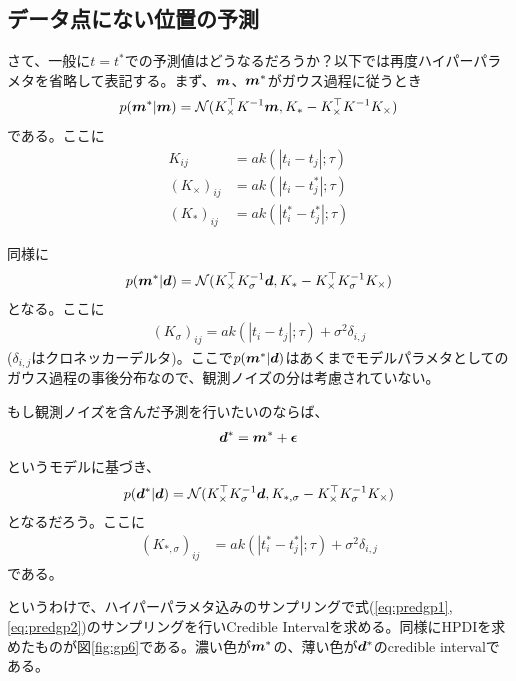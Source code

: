 \subsection*{データ点にない位置の予測}

さて、一般に$t=t^\ast$での予測値はどうなるだろうか？以下では再度ハイパーパラメタを省略して表記する。まず、$\boldsymbol{m}$、$\boldsymbol{m}^\ast$がガウス過程に従うとき
\begin{align}
p(\boldsymbol{m}^\ast|\boldsymbol{m}) = \mathcal{N} (K_{\times}^\top K^{-1}  \boldsymbol{m}, K_\ast - K_\times^\top K^{-1} K_\times)
\end{align}
である。ここに
\begin{align}
K_{ij} &= a k(|t_i-t_j|;\tau) \\
(K_{\times})_{ij} &= a k(|t_i-t^\ast_j|;\tau) \\
(K_{\ast})_{ij} &= a k(|t^\ast_i-t^\ast_j|;\tau) 
\end{align}

同様に
\begin{align}
\label{eq:predgp1}
p(\boldsymbol{m}^\ast|\boldsymbol{d}) =  \mathcal{N} (K_{\times}^\top K_\sigma^{-1}  \boldsymbol{d}, K_{\ast} - K_\times^\top K_\sigma^{-1} K_\times)
\end{align}
となる。ここに
\begin{align}
(K_{\sigma})_{ij} = a k(|t_i-t_j|;\tau) + \sigma^2 \delta_{i,j}
\end{align}
($\delta_{i,j}$はクロネッカーデルタ)。ここで$p(\boldsymbol{m}^\ast|\boldsymbol{d})$はあくまでモデルパラメタとしてのガウス過程の事後分布なので、観測ノイズの分は考慮されていない。

もし観測ノイズを含んだ予測を行いたいのならば、
\begin{align}
\boldsymbol{d}^\ast = \boldsymbol{m}^\ast + \boldsymbol{\epsilon}
\end{align}
というモデルに基づき、
\begin{align}
\label{eq:predgp2}
p(\boldsymbol{d}^\ast|\boldsymbol{d}) =  \mathcal{N} (K_{\times}^\top K_\sigma^{-1} \boldsymbol{d}, K_{\ast,\sigma} - K_\times^\top K_\sigma^{-1} K_\times)
\end{align}
となるだろう。ここに
\begin{align}
(K_{\ast,\sigma})_{ij} &= a k(|t^\ast_i-t^\ast_j|;\tau) + \sigma^2 \delta_{i,j}
\end{align}
である。

というわけで、ハイパーパラメタ込みのサンプリングで式(\ref{eq:predgp1},\ref{eq:predgp2})のサンプリングを行いCredible Intervalを求める。同様にHPDIを求めたものが図\ref{fig:gp6}である。濃い色が$\boldsymbol{m}^\ast$の、薄い色が$\boldsymbol{d}^\ast$のcredible intervalである。

